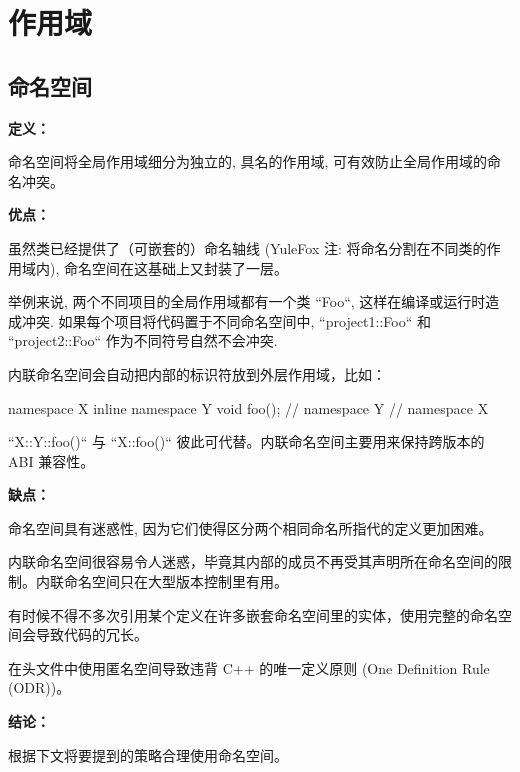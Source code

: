 \chapter{作用域}

\section{命名空间} \label{namespace}


\textbf{定义：}

命名空间将全局作用域细分为独立的, 具名的作用域, 可有效防止全局作用域的命名冲突。

\textbf{优点：}

虽然类已经提供了（可嵌套的）命名轴线 (YuleFox 注: 将命名分割在不同类的作用域内), 命名空间在这基础上又封装了一层。

举例来说, 两个不同项目的全局作用域都有一个类 ``Foo``, 这样在编译或运行时造成冲突. 如果每个项目将代码置于不同命名空间中,
``project1::Foo`` 和 ``project2::Foo`` 作为不同符号自然不会冲突.

内联命名空间会自动把内部的标识符放到外层作用域，比如：

\begin{cppcode}
  namespace X {
      inline namespace Y {
          void foo();
        }  // namespace Y
    }  // namespace X
\end{cppcode}

``X::Y::foo()`` 与 ``X::foo()`` 彼此可代替。内联命名空间主要用来保持跨版本的 ABI 兼容性。

\textbf{缺点：}

命名空间具有迷惑性, 因为它们使得区分两个相同命名所指代的定义更加困难。

内联命名空间很容易令人迷惑，毕竟其内部的成员不再受其声明所在命名空间的限制。内联命名空间只在大型版本控制里有用。

有时候不得不多次引用某个定义在许多嵌套命名空间里的实体，使用完整的命名空间会导致代码的冗长。

在头文件中使用匿名空间导致违背 C++ 的唯一定义原则 (One Definition Rule (ODR))。

\textbf{结论：}

根据下文将要提到的策略合理使用命名空间。

